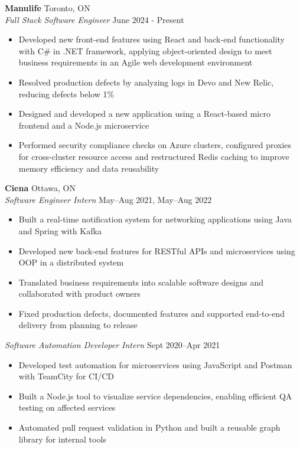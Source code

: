 \documentclass[a4paper,10pt]{article}
\begin{document}
\textbf{Manulife} \hfill Toronto, ON \\
\textit{Full Stack Software Engineer} \hfill June 2024 - Present
\begin{itemize}[itemsep=2pt]
    \item Developed new front-end features using React and back-end functionality with C\# in .NET framework, applying object-oriented design to meet business requirements in an Agile web development environment
    \item Resolved production defects by analyzing logs in Devo and New Relic, reducing defects below 1\%
    \item Designed and developed a new application using a React-based micro frontend and a Node.js microservice
    \item Performed security compliance checks on Azure clusters, configured proxies for cross-cluster resource access and restructured Redis caching to improve memory efficiency and data reusability
\end{itemize}

\textbf{Ciena} \hfill Ottawa, ON \\
\textit{Software Engineer Intern} \hfill May–Aug 2021, May–Aug 2022
\begin{itemize}[itemsep=2pt]
    \item Built a real-time notification system for networking applications using Java and Spring with Kafka
    \item Developed new back-end features for RESTful APIs and microservices using OOP in a distributed system
    \item Translated business requirements into scalable software designs and collaborated with product owners
    \item Fixed production defects, documented features and supported end-to-end delivery from planning to release
\end{itemize}

\textit{Software Automation Developer Intern} \hfill Sept 2020–Apr 2021
\begin{itemize}[itemsep=2pt]
    \item Developed test automation for microservices using JavaScript and Postman with TeamCity for CI/CD
    \item Built a Node.js tool to visualize service dependencies, enabling efficient QA testing on affected services
    \item Automated pull request validation in Python and built a reusable graph library for internal tools
\end{itemize}
\end{document}
